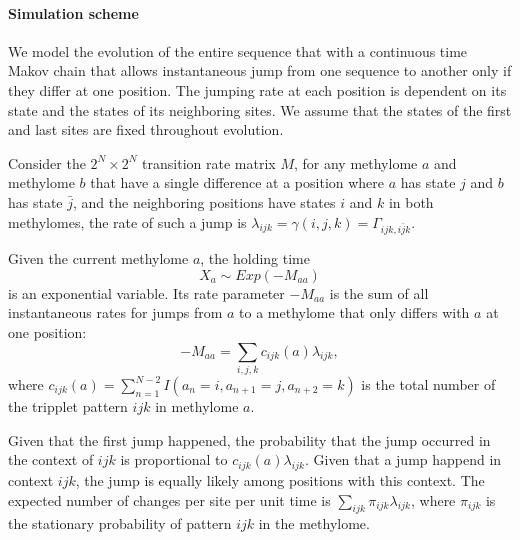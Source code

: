 \documentclass[11pt]{article}
\begin{document}
\paragraph{Simulation scheme}
We model the evolution of the entire sequence that with a continuous
time Makov chain that allows instantaneous jump from one sequence to
another only if they differ at one position. The jumping rate at each
position is dependent on its state and the states of its neighboring
sites. We assume that the states of the first and last sites are
fixed throughout evolution.

Consider the $2^N \times 2^N$ transition rate matrix $M$, for any
methylome $a$ and methylome $b$ that have a single difference at a
position where $a$ has state $j$ and $b$ has state $\bar{j}$, and the
neighboring positions have states $i$ and $k$ in both methylomes, the
rate of such a jump is $\lambda_{ijk} = \gamma(i, j, k) = \Gamma_{ijk,
i\bar{j}k}$.

Given the current methylome $a$, the holding time
\[
  X_a\sim Exp(-M_{aa})
\]
is an exponential variable. Its rate parameter $-M_{aa}$ is the
sum of all instantaneous rates for jumps from $a$ to a methylome that
only differs with $a$ at one position:
\[
  -M_{aa} =  \sum\limits_{i,j,k}c_{ijk}(a)\lambda_{ijk},
\]
where $c_{ijk}(a) = \sum_{n=1}^{N-2}I(a_{n}=i, a_{n+1}=j, a_{n+2}=k)$
is the total number of the tripplet pattern $ijk$ in methylome $a$.

Given that the first jump happened, the probability that the jump
occurred in the context of $ijk$ is proportional to
$c_{ijk}(a)\lambda_{ijk}$. Given that a jump happend in context $ijk$,
the jump is equally likely among positions with this context.
The expected number of changes per site per unit time is
$\sum\limits_{ijk}\pi_{ijk}\lambda_{ijk}$, where $\pi_{ijk}$ is the
stationary probability of pattern $ijk$ in the methylome.
\end{document}
